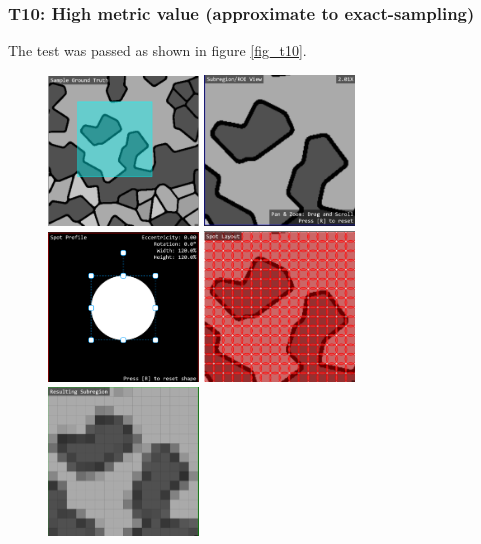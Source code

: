 \documentclass[12pt, titlepage]{article}
\begin{document}
\subsubsection{T10: High metric value (approximate to exact-sampling)}
The test was passed as shown in figure \ref{fig_t10}.
\begin{figure}[h!]
  \begin{center}
   \includegraphics[width=4cm]{t10a.png}
   \includegraphics[width=4cm]{t10b.png}
   \includegraphics[width=4cm]{t10c.png}
   \includegraphics[width=4cm]{t10d.png}
   \includegraphics[width=4cm]{t10e.png}

\end{center}
\end{figure}
\end{document}
